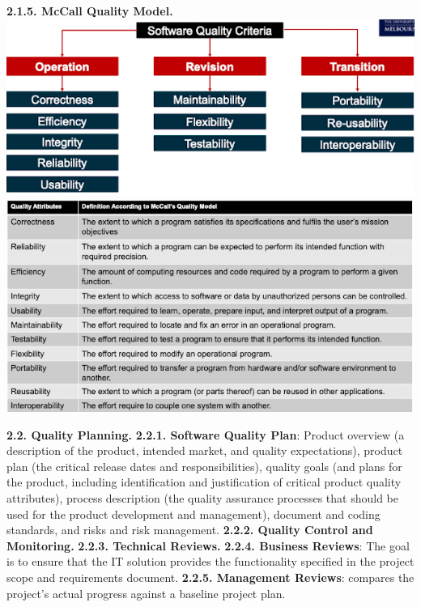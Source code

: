         \textbf{2.1.5. McCall Quality Model.}
        \includegraphics[width=\linewidth]{figs/SCR-20240606-orsk.png}
        \includegraphics[width=\linewidth]{figs/SCR-20240606-osms.png}

    \textbf{2.2. Quality Planning.}
        \textbf{2.2.1. Software Quality Plan}: Product overview (a description of the product, intended market, and quality expectations), product plan (the critical release dates and responsibilities), quality goals (and plans for the product, including identification and justification of critical product quality attributes), process description (the quality assurance processes that should be used for the product development and management), document and coding standards, and risks and risk management.
        \textbf{2.2.2. Quality Control and Monitoring.}
        \textbf{2.2.3. Technical Reviews.}
        \textbf{2.2.4. Business Reviews}: The goal is to ensure that the IT solution provides the functionality specified in the project scope and requirements document.
        \textbf{2.2.5. Management Reviews}: compares the project's actual progress against a baseline project plan.

